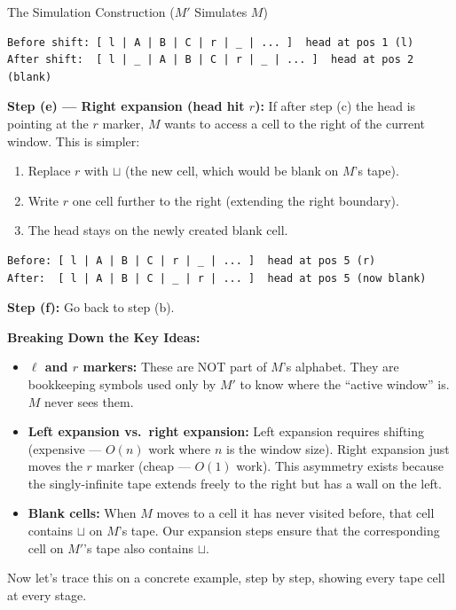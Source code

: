 \begin{definitionbox}{{The Simulation Construction ($M'$ Simulates $M$)}}
\begin{lstlisting}
Before shift: [ l | A | B | C | r | _ | ... ]  head at pos 1 (l)
After shift:  [ l | _ | A | B | C | r | _ | ... ]  head at pos 2 (blank)
\end{lstlisting}

\textbf{Step (e) --- Right expansion (head hit $r$):}
If after step (c) the head is pointing at the $r$ marker, $M$ wants to access
a cell to the right of the current window. This is simpler:
\begin{enumerate}[nosep]
\item Replace $r$ with $\sqcup$ (the new cell, which would be blank on
  $M$'s tape).
\item Write $r$ one cell further to the right (extending the right boundary).
\item The head stays on the newly created blank cell.
\end{enumerate}

\begin{lstlisting}
Before: [ l | A | B | C | r | _ | ... ]  head at pos 5 (r)
After:  [ l | A | B | C | _ | r | ... ]  head at pos 5 (now blank)
\end{lstlisting}

\textbf{Step (f):} Go back to step (b).

\textbf{Breaking Down the Key Ideas:}
\begin{itemize}[nosep]
\item \textbf{$\ell$ and $r$ markers:} These are NOT part of $M$'s alphabet.
  They are bookkeeping symbols used only by $M'$ to know where the
  ``active window'' is. $M$ never sees them.
\item \textbf{Left expansion vs.\ right expansion:} Left expansion requires
  shifting (expensive --- $O(n)$ work where $n$ is the window size). Right
  expansion just moves the $r$ marker (cheap --- $O(1)$ work). This asymmetry
  exists because the singly-infinite tape extends freely to the right but has
  a wall on the left.
\item \textbf{Blank cells:} When $M$ moves to a cell it has never visited
  before, that cell contains $\sqcup$ on $M$'s tape. Our expansion steps
  ensure that the corresponding cell on $M'$'s tape also contains $\sqcup$.
\end{itemize}
\end{definitionbox}

Now let's trace this on a concrete example, step by step, showing every tape
cell at every stage.

